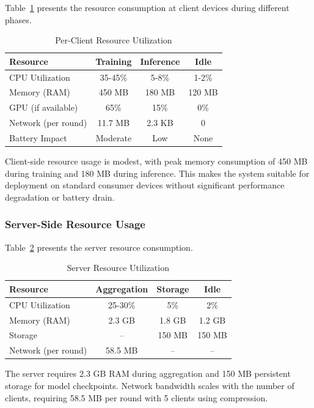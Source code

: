 Table~\ref{tab:client_resources} presents the resource consumption at client devices during different phases.

\begin{table}[h]
\centering
\caption{Per-Client Resource Utilization}
\label{tab:client_resources}
\begin{tabular}{lccc}
\toprule
\textbf{Resource} & \textbf{Training} & \textbf{Inference} & \textbf{Idle} \\
\midrule
CPU Utilization & 35-45\% & 5-8\% & 1-2\% \\
Memory (RAM) & 450 MB & 180 MB & 120 MB \\
GPU (if available) & 65\% & 15\% & 0\% \\
Network (per round) & 11.7 MB & 2.3 KB & 0 \\
Battery Impact & Moderate & Low & None \\
\bottomrule
\end{tabular}
\end{table}

Client-side resource usage is modest, with peak memory consumption of 450 MB during training and 180 MB during inference. This makes the system suitable for deployment on standard consumer devices without significant performance degradation or battery drain.

\subsubsection{Server-Side Resource Usage}

Table~\ref{tab:server_resources} presents the server resource consumption.

\begin{table}[h]
\centering
\caption{Server Resource Utilization}
\label{tab:server_resources}
\begin{tabular}{lccc}
\toprule
\textbf{Resource} & \textbf{Aggregation} & \textbf{Storage} & \textbf{Idle} \\
\midrule
CPU Utilization & 25-30\% & 5\% & 2\% \\
Memory (RAM) & 2.3 GB & 1.8 GB & 1.2 GB \\
Storage & -- & 150 MB & 150 MB \\
Network (per round) & 58.5 MB & -- & -- \\
\bottomrule
\end{tabular}
\end{table}

The server requires 2.3 GB RAM during aggregation and 150 MB persistent storage for model checkpoints. Network bandwidth scales with the number of clients, requiring 58.5 MB per round with 5 clients using compression.

